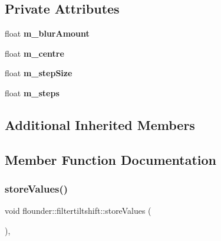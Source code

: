 \subsection*{Private Attributes}
\begin{DoxyCompactItemize}
\item 
\mbox{\label{classflounder_1_1filtertiltshift_aaeab734f3a161f674e0f19069b4dc2da}} 
float {\bfseries m\+\_\+blur\+Amount}
\item 
\mbox{\label{classflounder_1_1filtertiltshift_aa443e2cd33ed1d98355c368537d8dc11}} 
float {\bfseries m\+\_\+centre}
\item 
\mbox{\label{classflounder_1_1filtertiltshift_a1e7f7d4bf90dbf93ecc9d27b159d390a}} 
float {\bfseries m\+\_\+step\+Size}
\item 
\mbox{\label{classflounder_1_1filtertiltshift_afaa06de28aa7abf9c70d38c7dedc164c}} 
float {\bfseries m\+\_\+steps}
\end{DoxyCompactItemize}
\subsection*{Additional Inherited Members}


\subsection{Member Function Documentation}
\mbox{\label{classflounder_1_1filtertiltshift_a8e04e52da882a2d78d7a0e1f70717114}} 
\subsubsection{\texorpdfstring{store\+Values()}{storeValues()}}
{\footnotesize\ttfamily void flounder\+::filtertiltshift\+::store\+Values (\begin{DoxyParamCaption}{ }\end{DoxyParamCaption})\hspace{0.3cm}{\ttfamily [override]}, {\ttfamily [virtual]}}



